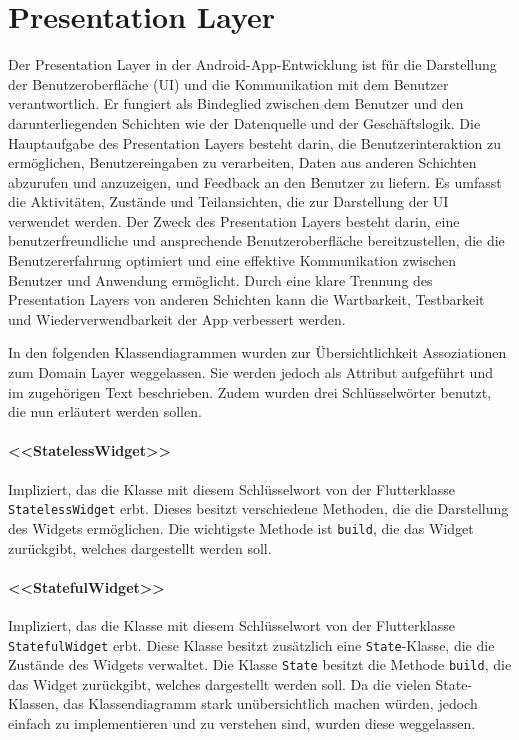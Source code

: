 \documentclass{entwurfsheft}
\begin{document}
\section{Presentation Layer}
Der Presentation Layer in der Android-App-Entwicklung ist für die Darstellung der Benutzeroberfläche (UI) und die Kommunikation mit dem Benutzer verantwortlich. Er fungiert als Bindeglied zwischen dem Benutzer und den darunterliegenden Schichten wie der Datenquelle und der Geschäftslogik. Die Hauptaufgabe des Presentation Layers besteht darin, die Benutzerinteraktion zu ermöglichen, Benutzereingaben zu verarbeiten, Daten aus anderen Schichten abzurufen und anzuzeigen, und Feedback an den Benutzer zu liefern. Es umfasst die Aktivitäten, Zustände und Teilansichten, die zur Darstellung der UI verwendet werden. Der Zweck des Presentation Layers besteht darin, eine benutzerfreundliche und ansprechende Benutzeroberfläche bereitzustellen, die die Benutzererfahrung optimiert und eine effektive Kommunikation zwischen Benutzer und Anwendung ermöglicht. Durch eine klare Trennung des Presentation Layers von anderen Schichten kann die Wartbarkeit, Testbarkeit und Wiederverwendbarkeit der App verbessert werden.

In den folgenden Klassendiagrammen wurden zur Übersichtlichkeit Assoziationen zum Domain Layer weggelassen. Sie werden jedoch als Attribut aufgeführt und im zugehörigen Text beschrieben. Zudem wurden drei Schlüsselwörter benutzt, die nun erläutert werden sollen.

\paragraph{<<StatelessWidget>>}
Impliziert, das die Klasse mit diesem Schlüsselwort von der Flutterklasse \texttt{StatelessWidget} erbt. Dieses besitzt verschiedene Methoden, die die Darstellung des Widgets ermöglichen. Die wichtigste Methode ist \texttt{build}, die das Widget zurückgibt, welches dargestellt werden soll.
\paragraph{<<StatefulWidget>>}
Impliziert, das die Klasse mit diesem Schlüsselwort von der Flutterklasse \texttt{StatefulWidget} erbt. Diese Klasse besitzt zusätzlich eine \texttt{State}-Klasse, die die Zustände des Widgets verwaltet. Die Klasse \texttt{State} besitzt die Methode \texttt{build}, die das Widget zurückgibt, welches dargestellt werden soll. Da die vielen State-Klassen, das Klassendiagramm stark unübersichtlich machen würden, jedoch einfach zu implementieren und zu verstehen sind, wurden diese weggelassen.
\end{document}
